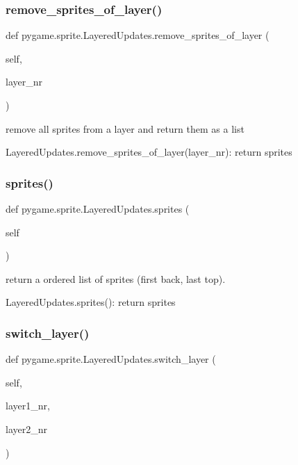 \subsubsection{\texorpdfstring{remove\+\_\+sprites\+\_\+of\+\_\+layer()}{remove\_sprites\_of\_layer()}}
{\footnotesize\ttfamily def pygame.\+sprite.\+Layered\+Updates.\+remove\+\_\+sprites\+\_\+of\+\_\+layer (\begin{DoxyParamCaption}\item[{}]{self,  }\item[{}]{layer\+\_\+nr }\end{DoxyParamCaption})}

\begin{DoxyVerb}remove all sprites from a layer and return them as a list

LayeredUpdates.remove_sprites_of_layer(layer_nr): return sprites\end{DoxyVerb}
 \mbox{\label{classpygame_1_1sprite_1_1_layered_updates_a882f93b671aae75a92a8512e8cbbb61d}} 
\subsubsection{\texorpdfstring{sprites()}{sprites()}}
{\footnotesize\ttfamily def pygame.\+sprite.\+Layered\+Updates.\+sprites (\begin{DoxyParamCaption}\item[{}]{self }\end{DoxyParamCaption})}

\begin{DoxyVerb}return a ordered list of sprites (first back, last top).

LayeredUpdates.sprites(): return sprites\end{DoxyVerb}
 \mbox{\label{classpygame_1_1sprite_1_1_layered_updates_a62b4dec222019c47c925401f71ea733b}} 
\subsubsection{\texorpdfstring{switch\+\_\+layer()}{switch\_layer()}}
{\footnotesize\ttfamily def pygame.\+sprite.\+Layered\+Updates.\+switch\+\_\+layer (\begin{DoxyParamCaption}\item[{}]{self,  }\item[{}]{layer1\+\_\+nr,  }\item[{}]{layer2\+\_\+nr }\end{DoxyParamCaption})}

